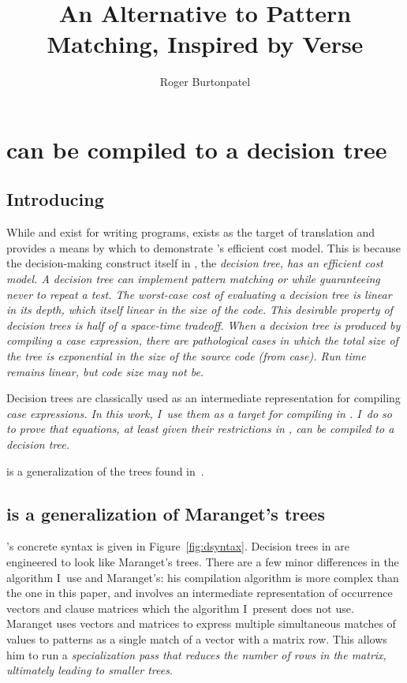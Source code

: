 \documentclass[manuscript,screen,review, 12pt, nonacm]{acmart}
\title{An Alternative to Pattern Matching, Inspired by Verse}
\author{Roger Burtonpatel}
\affiliation{%
\institution{Tufts University}
\streetaddress{419 Boston Ave}
  \city{Medford}
  \state{Massachusetts}
  \country{USA}
  \postcode{02155}
  }
\begin{document}
  

\section{\VMinus can be compiled to a decision tree}
\label{vminustod}

\subsection{Introducing \D}
\label{d}

While \PPlus and \VMinus exist for writing programs, \D exists as the target of
translation and provides a means by which to demonstrate \VMinus's efficient
cost model. This is because the decision-making construct itself in \D, the
\it{decision tree}, has an efficient cost model. A decision tree can implement
pattern matching or \iffibf while guaranteeing never to repeat a test. The
worst-case cost of evaluating a decision tree is linear in its depth, which
itself linear in the size of the code. This desirable property of decision trees
is half of a space-time tradeoff. When a decision tree is produced by compiling
a \it{case} expression, there are pathological cases in which the total size of
the tree is exponential in the size of the source code (from \it{case}). Run
time remains linear, but code size may not be. 

Decision trees are classically used as an intermediate representation for
compiling \it{case} expressions. In this work, I~use them as a target for
compiling \iffibf in \VMinus. I~do so to prove that equations, at least given
their restrictions in \VMinus, can be compiled to a decision tree. 

\D is a generalization of the trees found in~\citet{maranget}. 

\subsection{\D is a generalization of Maranget's trees} 

\D's concrete syntax is given in Figure~\ref{fig:dsyntax}. Decision trees in \D
  are engineered to look like Maranget's trees. There are a few minor
  differences in the algorithm I~use and Maranget's: his compilation algorithm
  is more complex than the one in this paper, and involves an intermediate
  representation of occurrence vectors and clause matrices which the algorithm
  I~present does not use. Maranget uses vectors and matrices to express
  multiple simultaneous matches of values to patterns as a single match of a
  vector with a matrix row. This allows him to run a \it{specialization} pass
  that reduces the number of rows in the matrix, ultimately leading to smaller
  trees.
  
\end{document}
